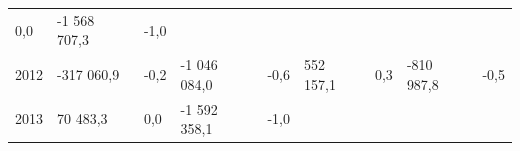 \begin{longtable}[]{@{}lllllllll@{}}
\begin{minipage}[t]{0.06\columnwidth}
0,0\strut
\end{minipage} & \begin{minipage}[t]{0.10\columnwidth}\raggedright
-1 568 707,3\strut
\end{minipage} & \begin{minipage}[t]{0.06\columnwidth}\raggedright
-1,0\strut
\end{minipage}\tabularnewline
\begin{minipage}[t]{0.05\columnwidth}\raggedright
2012\strut
\end{minipage} & \begin{minipage}[t]{0.10\columnwidth}\raggedright
-317 060,9\strut
\end{minipage} & \begin{minipage}[t]{0.06\columnwidth}\raggedright
-0,2\strut
\end{minipage} & \begin{minipage}[t]{0.16\columnwidth}\raggedright
-1 046 084,0\strut
\end{minipage} & \begin{minipage}[t]{0.06\columnwidth}\raggedright
-0,6\strut
\end{minipage} & \begin{minipage}[t]{0.12\columnwidth}\raggedright
552 157,1\strut
\end{minipage} & \begin{minipage}[t]{0.06\columnwidth}\raggedright
0,3\strut
\end{minipage} & \begin{minipage}[t]{0.10\columnwidth}\raggedright
-810 987,8\strut
\end{minipage} & \begin{minipage}[t]{0.06\columnwidth}\raggedright
-0,5\strut
\end{minipage}\tabularnewline
\begin{minipage}[t]{0.05\columnwidth}\raggedright
2013\strut
\end{minipage} & \begin{minipage}[t]{0.10\columnwidth}\raggedright
70 483,3\strut
\end{minipage} & \begin{minipage}[t]{0.06\columnwidth}\raggedright
0,0\strut
\end{minipage} & \begin{minipage}[t]{0.16\columnwidth}\raggedright
-1 592 358,1\strut
\end{minipage} & \begin{minipage}[t]{0.06\columnwidth}\raggedright
-1,0\strut

\end{minipage}
\end{longtable}
